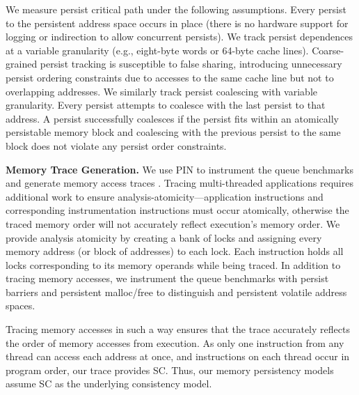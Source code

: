 We measure persist critical path under the following assumptions.
Every persist to the persistent address space occurs in place (there is no hardware support for logging or indirection to allow concurrent persists).
We track persist dependences at a variable granularity (e.g., eight-byte words or 64-byte cache lines).
Coarse-grained persist tracking is susceptible to false sharing, introducing unnecessary persist ordering constraints due to accesses to the same cache line but not to overlapping addresses.
We similarly track persist coalescing with variable granularity.
Every persist attempts to coalesce with the last persist to that address.
A persist successfully coalesces if the persist fits within an atomically persistable memory block and coalescing with the previous persist to the same block does not violate any persist order constraints.

\textbf{Memory Trace Generation.}
We use PIN to instrument the queue benchmarks and generate memory access traces \cite{LukCohn05}.
Tracing multi-threaded applications requires additional work to ensure analysis-atomicity---application instructions and corresponding instrumentation instructions must occur atomically, otherwise the traced memory order will not accurately reflect execution's memory order.
We provide analysis atomicity by creating a bank of locks and assigning every memory address (or block of addresses) to each lock.
Each instruction holds all locks corresponding to its memory operands while being traced.
In addition to tracing memory accesses, we instrument the queue benchmarks with persist barriers and persistent malloc/free to distinguish and persistent volatile address spaces.

Tracing memory accesses in such a way ensures that the trace accurately reflects the order of memory accesses from execution.
As only one instruction from any thread can access each address at once, and instructions on each thread occur in program order, our trace provides SC.
Thus, our memory persistency models assume SC as the underlying consistency model.

